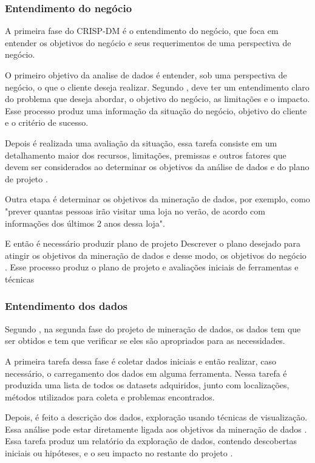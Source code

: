 \subsubsection{Entendimento do negócio}
A primeira fase do CRISP-DM é o entendimento do negócio, que foca em entender os objetivos do negócio e seus requerimentos de uma perspectiva de negócio.

O primeiro objetivo da analise de dados é entender, sob uma perspectiva de negócio, o que o cliente deseja realizar. Segundo , deve ter um entendimento claro do problema que deseja abordar, o objetivo do negócio, as limitações e o impacto. Esse processo produz uma informação da situação do negócio, objetivo do cliente e o critério de sucesso.

Depois é realizada uma avaliação da situação, essa tarefa consiste em um detalhamento maior dos recursos, limitações, premissas e outros fatores que devem ser considerados ao determinar os objetivos da análise de dados e do plano de projeto \citep{crispmanual}.

Outra etapa é determinar os objetivos da mineração de dados, por exemplo, como "prever quantas pessoas irão visitar uma loja no verão, de acordo com informações dos últimos 2 anos dessa loja".

E então é necessário produzir plano de projeto Descrever o plano desejado para atingir os objetivos da mineração de dados e desse modo, os objetivos do negócio \citep{crispmanual}. Esse processo produz o plano de projeto e avaliações iniciais de ferramentas e técnicas

\subsubsection{Entendimento dos dados}
Segundo , na segunda fase do projeto de mineração de dados, os dados tem que ser obtidos e tem que verificar se eles são apropriados para as necessidades.

A primeira tarefa dessa fase é coletar dados iniciais e então realizar, caso necessário, o carregamento dos dados em alguma ferramenta. Nessa tarefa é produzida uma lista de todos os datasets adquiridos, junto com localizações, métodos utilizados para coleta e problemas encontrados.

Depois, é feito a descrição dos dados, exploração usando técnicas de visualização. Essa análise pode estar diretamente ligada aos objetivos da mineração de dados \citep{crispmanual}. Essa tarefa produz um relatório da exploração de dados, contendo descobertas iniciais ou hipóteses, e o seu impacto no restante do projeto \citep{crispmanual}.

